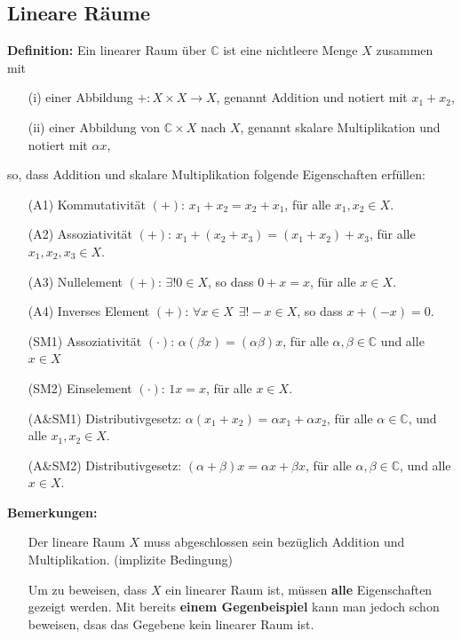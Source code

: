 \documentclass[11pt]{article}
\begin{document}
\subsection*{Lineare Räume}
\vspace*{-0.5cm}
\textbf{Definition:} Ein linearer Raum über $\mathbb{C}$ ist eine nichtleere Menge $X$ zusammen mit 
\vspace*{-0.5cm}
\begin{itemize}
    \item[(i)] einer Abbildung $+:X\times X \to X$, genannt Addition und notiert mit $x_1 + x_2$,
    \item[(ii)] einer Abbildung von $\mathbb{C} \times X$ nach $ X$, genannt skalare Multiplikation und notiert mit $\alpha x$,
\end{itemize}
\vspace*{-0.5cm}
so, dass Addition und skalare Multiplikation folgende Eigenschaften erfüllen: 
\vspace*{-0.5cm}
\begin{itemize}[leftmargin=6em]
    \item[(A1)] Kommutativität $(+)$: $x_1 + x_2 = x_2 + x_1$, für alle $x_1, x_2 \in X$.
    \item[(A2)] Assoziativität $(+)$: $x_1 + (x_2 + x_3) = (x_1 + x_2) + x_3$, für alle $x_1, x_2, x_3 \in X$.
    \item[(A3)] Nullelement $(+)$: $\exists ! 0 \in X$, so dass $0+x = x$, für alle $x \in X$. 
    \item[(A4)] Inverses Element $(+)$: $\forall x \in X \hspace{5pt} \exists ! -\!x \in X$, so dass $x + (-x) = 0$.
    \item[(SM1)] Assoziativität $(\cdot)$: $\alpha(\beta x) = (\alpha \beta)x$, für alle $\alpha, \beta \in \mathbb{C}$ und alle $x \in X$
    \item[(SM2)] Einselement $(\cdot)$: $1x = x$, für alle $x\in X$.
    \item[(A\&SM1)] Distributivgesetz: $\alpha(x_1 + x_2) = \alpha x_1 + \alpha x_2$, für alle $\alpha \in \mathbb{C}$, und alle $x_1, x_2 \in X$.
    \item[(A\&SM2)] Distributivgesetz: $(\alpha + \beta)x = \alpha x + \beta x$, für alle $\alpha, \beta \in \mathbb{C}$, und alle $x \in X$.
\end{itemize}
\vspace*{-0.5cm}

\textbf{Bemerkungen:}
\vspace*{-0.5cm}
\begin{itemize}[leftmargin=0pt]
    \item[] Der lineare Raum $X$ muss abgeschlossen sein bezüglich Addition und Multiplikation. (implizite Bedingung)
    \item[] Um zu beweisen, dass $X$ ein linearer Raum ist, müssen \textbf{alle} Eigenschaften gezeigt werden. Mit bereits \textbf{einem Gegenbeispiel} kann man jedoch schon beweisen, dsas das Gegebene kein linearer Raum ist.
\end{itemize}
\end{document}
